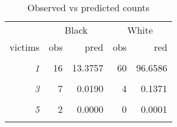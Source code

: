 \begin{table}

\caption{\label{tab:obs_vs_pred}Observed vs predicted counts}
\centering
\begin{tabular}[t]{>{}rrrrr}
\toprule
\multicolumn{1}{c}{ } & \multicolumn{2}{c}{Black} & \multicolumn{2}{c}{White} \\
\cmidrule(l{3pt}r{3pt}){2-3} \cmidrule(l{3pt}r{3pt}){4-5}
victims & obs & pred & obs & red\\
\midrule
\em{\cellcolor{gray!6}{0}} & \cellcolor{gray!6}{119} & \cellcolor{gray!6}{144.9879} & \cellcolor{gray!6}{1070} & \cellcolor{gray!6}{1047.7425}\\
\em{1} & 16 & 13.3757 & 60 & 96.6586\\
\em{\cellcolor{gray!6}{2}} & \cellcolor{gray!6}{12} & \cellcolor{gray!6}{0.6170} & \cellcolor{gray!6}{14} & \cellcolor{gray!6}{4.4586}\\
\em{3} & 7 & 0.0190 & 4 & 0.1371\\
\em{\cellcolor{gray!6}{4}} & \cellcolor{gray!6}{3} & \cellcolor{gray!6}{0.0004} & \cellcolor{gray!6}{0} & \cellcolor{gray!6}{0.0032}\\
\addlinespace
\em{5} & 2 & 0.0000 & 0 & 0.0001\\
\em{\cellcolor{gray!6}{6}} & \cellcolor{gray!6}{0} & \cellcolor{gray!6}{0.0000} & \cellcolor{gray!6}{1} & \cellcolor{gray!6}{0.0000}\\
\bottomrule
\end{tabular}
\end{table}
